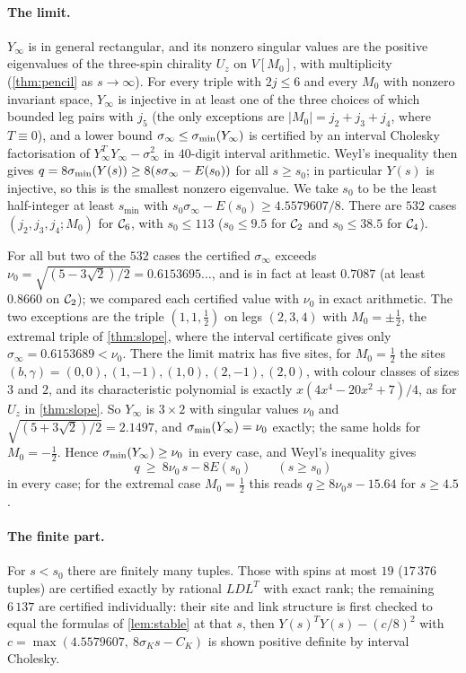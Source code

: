 \paragraph{The limit.}
$Y_\infty$ is in general rectangular, and its nonzero singular values are the positive
eigenvalues of the three-spin chirality $U_z$ on $V[M_0]$, with multiplicity
(\cref{thm:pencil} as $s\to\infty$). For every triple with $2j\le6$ and every $M_0$ with
nonzero invariant space, $Y_\infty$ is injective in at least one of the three choices of which
bounded leg pairs with $j_5$ (the only exceptions are $|M_0|=j_2+j_3+j_4$, where $T\equiv0$),
and a lower bound $\sigma_\infty\le\sigma_{\min}(Y_\infty)$ is certified by an interval Cholesky
factorisation of $Y_\infty^TY_\infty-\sigma_\infty^2$ in $40$-digit interval arithmetic.
Weyl's inequality then gives $q=8\sigma_{\min}(Y(s))\ge8(s\sigma_\infty-E(s_0))$ for all $s\ge s_0$;
in particular $Y(s)$ is injective, so this is the smallest nonzero eigenvalue. We take $s_0$
to be the least half-integer at least $s_{\min}$ with $s_0\sigma_\infty-E(s_0)\ge4.5579607/8$.
There are $532$ cases $(j_2,j_3,j_4;M_0)$ for $\mathcal{C}_6$, with $s_0\le113$ ($s_0\le9.5$ for $\mathcal{C}_2$
and $s_0\le38.5$ for $\mathcal{C}_4$).

For all but two of the $532$ cases the certified $\sigma_\infty$ exceeds
$\nu_0=\sqrt{(5-3\sqrt2)/2}=0.6153695\ldots$, and is in fact at least $0.7087$ (at least
$0.8660$ on $\mathcal{C}_2$); we compared each certified value with $\nu_0$ in exact arithmetic. The
two exceptions are the triple $(1,1,\frac12)$ on legs $(2,3,4)$ with $M_0=\pm\frac12$, the
extremal triple of \cref{thm:slope}, where the interval certificate gives only
$\sigma_\infty=0.6153689<\nu_0$. There the limit matrix has five sites, for $M_0=\frac12$ the
sites $(b,\gamma)=(0,0),(1,-1),(1,0),(2,-1),(2,0)$, with colour classes of sizes $3$ and $2$, and
its characteristic polynomial is exactly $x(4x^4-20x^2+7)/4$, as for $U_z$ in \cref{thm:slope}.
So $Y_\infty$ is $3\times2$ with singular values $\nu_0$ and $\sqrt{(5+3\sqrt2)/2}=2.1497$, and
$\sigma_{\min}(Y_\infty)=\nu_0$ exactly; the same holds for $M_0=-\frac12$. Hence $\sigma_{\min}(Y_\infty)\ge\nu_0$
in every case, and Weyl's inequality gives
\[
  q\ \ge\ 8\nu_0\,s-8E(s_0)\qquad(s\ge s_0)
\]
in every case; for the extremal case $M_0=\frac12$ this reads $q\ge8\nu_0s-15.64$ for $s\ge4.5$.

\paragraph{The finite part.}
For $s<s_0$ there are finitely many tuples. Those with spins at most $19$ ($17\,376$ tuples)
are certified exactly by rational $LDL^T$ with exact rank; the remaining $6\,137$ are
certified individually: their site and link structure is first checked to equal the
formulas of \cref{lem:stable} at that $s$, then $Y(s)^TY(s)-(c/8)^2$ with
$c=\max(4.5579607,\ 8\sigma_Ks-C_K)$ is shown positive definite by interval Cholesky.

